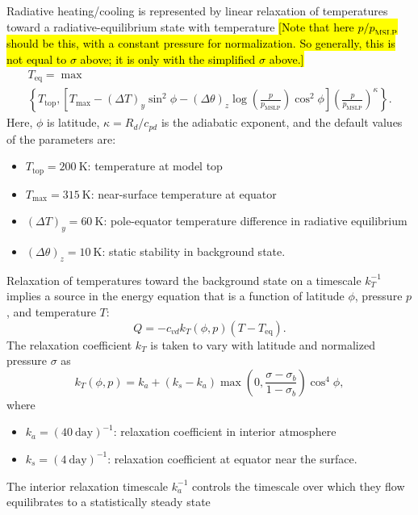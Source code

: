 \documentclass{report}
\begin{document}
{Radiative heating/cooling is represented by linear relaxation of temperatures toward a radiative-equilibrium state with temperature \hl{[Note that here $p/p_{\mathrm{MSLP}}$ should be this, with a constant pressure for normalization. So generally, this is not equal to $\sigma$ above; it is only with the simplified $\sigma$ above.]}
\begin{multline}
    T_{\mathrm{eq}} = \max \\
    \left\{ T_{\mathrm{top}}, \left[ T_{\max} - (\Delta T)_y \sin^2 \phi - (\Delta \theta)_z \log\left(\frac{p}{p_{\mathrm{MSLP}}}\right) \cos^2 \phi \right]
    \left( \frac{p}{p_{\mathrm{MSLP}}} \right)^{\kappa} \right\}.
\end{multline}
Here, $\phi$ is latitude, $\kappa = R_d/c_{pd}$ is the adiabatic exponent, and the default values of the parameters are:
\begin{itemize}
    \item $T_{\mathrm{top}} = 200~\mathrm{K}$: temperature at model top
    \item $T_{\max} = 315~\mathrm{K}$: near-surface temperature at equator
    \item $(\Delta T)_y = 60~\mathrm{K}$: pole-equator temperature difference in radiative equilibrium
    \item $(\Delta \theta)_z = 10~\mathrm{K}$: static stability in background state.
\end{itemize}

Relaxation of temperatures toward the background state on a timescale $k_T^{-1}$ implies a source in the energy equation that is a function of latitude $\phi$, pressure $p$, and temperature $T$:
\begin{equation}
    Q =  - c_{vd} k_T(\phi, p) (T - T_{\mathrm{eq}}).
\end{equation} 
The relaxation coefficient $k_T$ is taken to vary with latitude and normalized pressure $\sigma$ as
\begin{equation}
k_T(\phi, p) = k_a + (k_s - k_a) \max\left(0, \frac{\sigma - \sigma_b}{1-\sigma_b}\right) \cos^4 \phi ,
\end{equation}
where 
\begin{itemize}
    \item $k_a = (40~\mathrm{day})^{-1}$: relaxation coefficient in interior atmosphere
    \item $k_s = (4~\mathrm{day})^{-1}$: relaxation coefficient  at equator near the surface.
\end{itemize}
The interior relaxation timescale $k_a^{-1}$ controls the timescale over which they flow equilibrates to a statistically steady state

}
\end{document}
